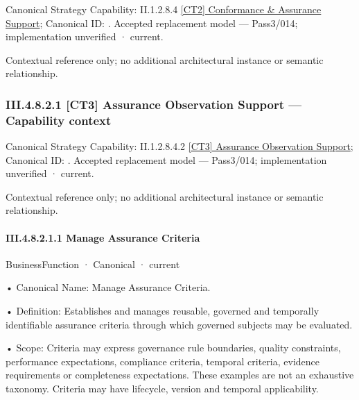 {\small Canonical Strategy Capability: II.1.2.8.4 \hyperref[element:131791faa80f408b8d566c601edd71be]{[CT2] Conformance \& Assurance Support}; Canonical ID: \texttt{}. Accepted replacement model — Pass3/014; implementation unverified · current.}\par
Contextual reference only; no additional architectural instance or semantic relationship.\par
\subsubsection*{III.4.8.2.1 [CT3] Assurance Observation Support — Capability context}
\label{navigation:III.4.8.2.1}

{\small Canonical Strategy Capability: II.1.2.8.4.2 \hyperref[element:48bb094dd2494228935c91551b149097]{[CT3] Assurance Observation Support}; Canonical ID: \texttt{}. Accepted replacement model — Pass3/014; implementation unverified · current.}\par
Contextual reference only; no additional architectural instance or semantic relationship.\par
\paragraph*{III.4.8.2.1.1 Manage Assurance Criteria}
\label{navigation:III.4.8.2.1.1}

\label{element:d7e9ba5addd94db2bce164c7c9809e4e}
{\small BusinessFunction · Canonical · current}\par

•
Canonical Name: Manage Assurance Criteria.



•
Definition: Establishes and manages reusable, governed and temporally identifiable assurance criteria through which governed subjects may be evaluated.



•
Scope: Criteria may express governance rule boundaries, quality constraints, performance expectations, compliance criteria, temporal criteria, evidence requirements or completeness expectations. These examples are not an exhaustive taxonomy. Criteria may have lifecycle, version and temporal applicability.



